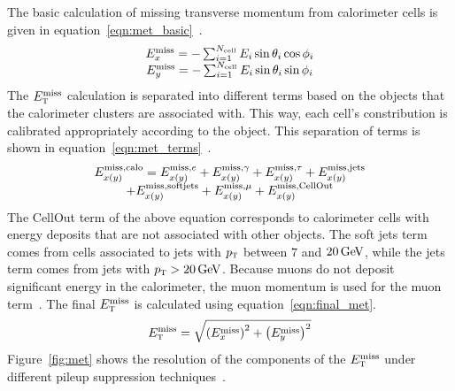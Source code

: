 The basic calculation of missing transverse momentum from calorimeter cells is given in equation~\ref{eqn:met_basic}~\cite{MET7TeV}. 
%
\begin{equation}
\label{eqn:met_basic}
\begin{array}{c}
E^{\rm miss}_x = - \sum_{i=1}^{N_{\rm cell}} E_i \sin \theta_i \cos \phi_i \\
E^{\rm miss}_y = - \sum_{i=1}^{N_{\rm cell}} E_i \sin \theta_i \sin \phi_i
\end{array}
\end{equation}
%
The $E_{\textrm{\footnotesize\sc t}}^{\rm miss}$ calculation is separated into different terms based on the objects that the calorimeter clusters are associated with. This way, each cell's constribution is calibrated appropriately according to the object. This separation of terms is shown in equation~\ref{eqn:met_terms}~\cite{MET7TeV}. 
%
\begin{equation}
\label{eqn:met_terms}
\begin{array}{c}
E^{\rm miss, calo}_{x(y)} = E^{\textrm{miss}, e}_{x(y)} + E^{\textrm{miss}, \gamma}_{x(y)} + E^{\textrm{miss}, \tau}_{x(y)} + E^{\textrm{miss}, \rm jets}_{x(y)} \\ 
+ E^{\textrm{miss}, \rm soft jets}_{x(y)} + E^{\textrm{miss}, \mu}_{x(y)} + E^{\textrm{miss}, \rm CellOut}_{x(y)}
\end{array}
\end{equation}
%
The CellOut term of the above equation corresponds to calorimeter cells with energy deposits that are not associated with other objects. The soft jets term comes from cells associated to jets with $p_{\textrm{\footnotesize\sc t}}$ between $7$ and $20 \GeV$, while the jets term comes from jets with $\pT > 20 \GeV$. Because muons do not deposit significant energy in the calorimeter, the muon momentum is used for the muon term~\cite{MET7TeV}. The final $E_{\textrm{\footnotesize\sc t}}^{\rm miss}$ is calculated using equation~\ref{eqn:final_met}.
%
\begin{equation}
\label{eqn:final_met}
E_{\textrm{\footnotesize\sc t}}^{\rm miss} = \sqrt{\left(E_x^{\rm miss}\right)^2 + \left(E_y^{\rm miss}\right)^2}
\end{equation}
%
Figure~\ref{fig:met} shows the resolution of the components of the $E_{\textrm{\footnotesize\sc t}}^{\rm miss}$ under different pileup suppression techniques~\cite{MET8TeV}. 
%
